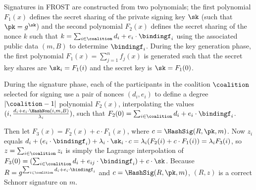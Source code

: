Signatures in FROST
are constructed from two polynomials;
the first polynomial $F_1(x)$ defines the secret sharing of the private
signing key $\sk$ (such that $\pk = g^{\sk}$) and the
second polynomial $F_2(x)$ defines the secret sharing of the nonce $k$
such that
\(
k = \sum_{i \in \coalition} d_i + e_i \cdot \bindingf_i
\)
using the associated public data $(m, B)$ to determine $\bindingf_i$.
During the key generation phase,
the first polynomial $F_1(x) = \sum_{j=1}^n f_j(x)$ is generated
such that the secret key shares are $\sk_i = F_1(i)$ and the secret key is $\sk = F_1(0)$.

During the signature phase,
each of the
participants in the coalition $\coalition$ selected for signing use a pair of nonces $(d_i, e_i)$ to
define a degree $\lvert\coalition-1 \rvert$ polynomial $F_2(x)$, interpolating the
values $(i,\frac{d_i + e_i \cdot \HashNon(i, m, B)}{\lambda_i})$,
such that $F_2(0) = \sum_{i \in \coalition} d_i + e_i \cdot \bindingf_i$.

Then let $F_3(x) = F_2(x) + c \cdot F_1(x)$, where
$c = \HashSig(R, \pk, m)$.  Now $z_i$
equals $d_i + (e_i \cdot \bindingf_i) + \lambda_i \cdot \sk_i \cdot c =
\lambda_i (F_2(i) + c \cdot F_1(i)) = \lambda_i F_3(i)$, so $z = \sum_{i \in \coalition} z_i$
is simply the Lagrange interpolation of $F_3(0) = (\sum_{i \in \coalition} d_i + e_{ij} \cdot \bindingf_i) + c
\cdot \sk$.
Because $R = g^{\sum_{i \in \coalition} d_i + e_i \cdot \bindingf_i}$ and $c
= \HashSig(R, \pk, m)$, $(R, z)$ is a
correct Schnorr signature on $m$.
